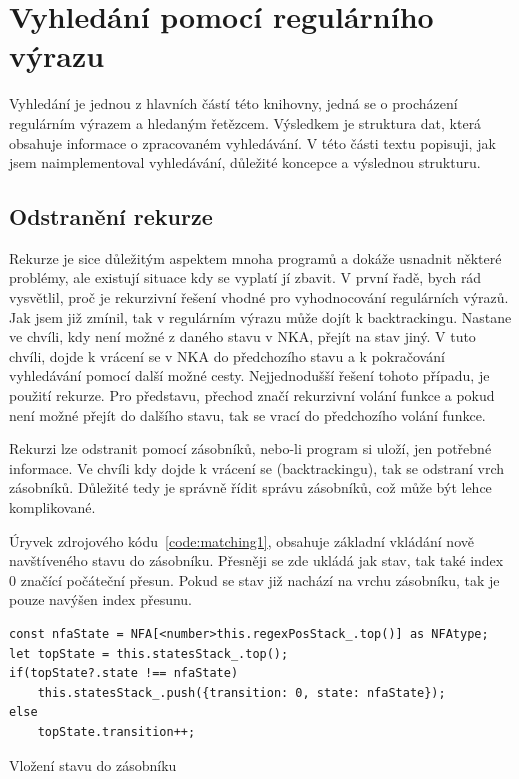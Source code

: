 \newpage

\section{Vyhledání pomocí regulárního výrazu}\label{sec:PatternMatching}

Vyhledání je jednou z hlavních částí této knihovny, jedná se o procházení regulárním výrazem a hledaným řetězcem.
Výsledkem je struktura dat, která obsahuje informace o zpracovaném vyhledávání.
V této části textu popisuji, jak jsem naimplementoval vyhledávání, důležité koncepce a výslednou strukturu.

\subsection*{Odstranění rekurze}

Rekurze je sice důležitým aspektem mnoha programů a dokáže usnadnit některé problémy, ale existují situace kdy se vyplatí jí zbavit.
V první řadě, bych rád vysvětlil, proč je rekurzivní řešení vhodné pro vyhodnocování regulárních výrazů.
Jak jsem již zmínil, tak v regulárním výrazu může dojít k backtrackingu.
Nastane ve chvíli, kdy není možné z daného stavu v NKA, přejít na stav jiný.
V tuto chvíli, dojde k vrácení se v NKA do předchozího stavu a k pokračování vyhledávání pomocí další možné cesty.
Nejjednodušší řešení tohoto případu, je použití rekurze.
Pro představu, přechod značí rekurzivní volání funkce a pokud není možné přejít do dalšího stavu, tak se vrací do předchozího volání funkce.

Rekurzi lze odstranit pomocí zásobníků, nebo-li program si uloží, jen potřebné informace.
Ve chvíli kdy dojde k vrácení se (backtrackingu), tak se odstraní vrch zásobníků.
Důležité tedy je správně řídit správu zásobníků, což může být lehce komplikované.

Úryvek zdrojového kódu~\ref{code:matching1}, obsahuje základní vkládání nově navštíveného stavu do zásobníku.
Přesněji se zde ukládá jak stav, tak také index 0 značící počáteční přesun.
Pokud se stav již nachází na vrchu zásobníku, tak je pouze navýšen index přesunu.

\begin{code}[!ht]
	\begin{verbatim}
const nfaState = NFA[<number>this.regexPosStack_.top()] as NFAtype;
let topState = this.statesStack_.top();
if(topState?.state !== nfaState)
	this.statesStack_.push({transition: 0, state: nfaState});
else
	topState.transition++;
	\end{verbatim}
	\caption{Vložení stavu do zásobníku}
	\label{code:matching1}
\end{code}

